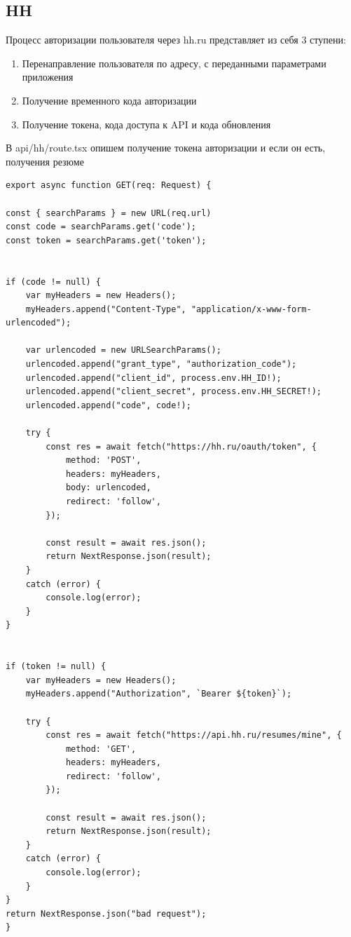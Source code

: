 \documentclass[master, och, pract]{SCWorks}
\begin{document}
\subsection{HH}
Процесс авторизации пользователя через hh.ru представляет из себя 3 ступени:
\begin{enumerate}
    \item Перенаправление пользователя по адресу, с переданными параметрами приложения
    \item Получение временного кода авторизации
    \item Получение токена, кода доступа к API и кода обновления  
\end{enumerate}


В api/hh/route.tsx опишем получение токена авторизации и если он есть, получения резюме
\begin{verbatim}
export async function GET(req: Request) {

const { searchParams } = new URL(req.url)
const code = searchParams.get('code');
const token = searchParams.get('token');


if (code != null) {
    var myHeaders = new Headers();
    myHeaders.append("Content-Type", "application/x-www-form-urlencoded");

    var urlencoded = new URLSearchParams();
    urlencoded.append("grant_type", "authorization_code");
    urlencoded.append("client_id", process.env.HH_ID!);
    urlencoded.append("client_secret", process.env.HH_SECRET!);
    urlencoded.append("code", code!);

    try {
        const res = await fetch("https://hh.ru/oauth/token", {
            method: 'POST',
            headers: myHeaders,
            body: urlencoded,
            redirect: 'follow',
        });
            
        const result = await res.json();
        return NextResponse.json(result);
    } 
    catch (error) {
        console.log(error);
    }
} 


if (token != null) {
    var myHeaders = new Headers();
    myHeaders.append("Authorization", `Bearer ${token}`);

    try {
        const res = await fetch("https://api.hh.ru/resumes/mine", {
            method: 'GET',
            headers: myHeaders,
            redirect: 'follow',
        });
            
        const result = await res.json();
        return NextResponse.json(result);
    } 
    catch (error) {
        console.log(error);
    }
}
return NextResponse.json("bad request");
}
\end{verbatim}
\end{document}
